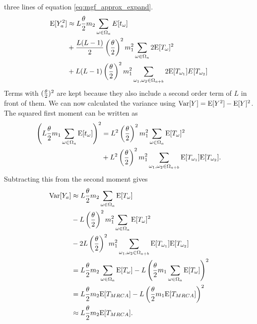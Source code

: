 three lines of equation \ref{eq:mgf_approx_expand}.
\begin{align}
  \mathrm{E}[Y_a^2] &\approx L\frac{\theta}{2} m_2 \sum_{\omega \in \Omega_a} E[t_\omega] \nonumber \\
  &+ \frac{L(L-1)}{2} \left(\frac{\theta}{2} \right)^2 m_1^2 \sum_{\omega \in \Omega_a} 2 \mathrm{E}[T_\omega]^2 \nonumber \\
  &+ L(L-1) \left(\frac{\theta}{2} \right)^2 m_1^2 \sum_{\omega_1 , \omega_2 \in \Omega_{a+b}} 2 \mathrm{E}[T_{\omega_1}]E[T_{\omega_2}]
\end{align}
Terms with $(\frac{\theta}{2})^2$ are kept because they also include a second order term of
$L$ in front of them. We can now calculated the variance using $\mathrm{Var}[Y]=\mathrm{E}[Y^2] -
\mathrm{E}[Y]^2$. The squared first moment can be written as
\begin{align}
  \left(L\frac{\theta}{2} m_1 \sum_{\omega \in \Omega_a} \mathrm{E}[t_\omega] \right)^2 &=
  L^2\left(\frac{\theta}{2}\right)^2 m_1^2 \sum_{\omega \in \Omega_a} \mathrm{E}[T_\omega]^2 \nonumber \\
  &+ L^2\left(\frac{\theta}{2}\right)^2 m_1^2 \sum_{\omega_1 , \omega_2 \in \Omega_{a+b}} \mathrm{E}[T_{\omega_1}]\mathrm{E}[T_{\omega_2}].
\end{align}
Subtracting this from the second moment gives
\begin{align}
  \label{eq:var}
  \mathrm{Var}[Y_a] &\approx L\frac{\theta}{2} m_2 \sum_{\omega \in \Omega_a} \mathrm{E}[T_\omega] \nonumber \\
  &- L \left(\frac{\theta}{2}\right)^2 m_1^2 \sum_{\omega \in \Omega_a}\mathrm{E}[T_\omega]^2 \nonumber \\
  &-  2L \left(\frac{\theta}{2}\right)^2 m_1^2 \sum_{\omega_1 , \omega_2 \in \Omega_{a+b}} \mathrm{E}[T_{\omega_1}]\mathrm{E}[T_{\omega_2}] \nonumber \\
  &= L\frac{\theta}{2} m_2 \sum_{\omega \in \Omega_a} \mathrm{E}[T_\omega] -
  L\left( \frac{\theta}{2} m_1 \sum_{\omega \in \Omega_a} \mathrm{E}[T_\omega] \right)^2 \nonumber \\
  &= L\frac{\theta}{2} m_2 \mathrm{E}[T_{MRCA}] - L\left( \frac{\theta}{2} m_1 \mathrm{E}[T_{MRCA}] \right)^2  \\
  &\approx L\frac{\theta}{2} m_2 \mathrm{E}[T_{MRCA}].  \nonumber
\end{align}

